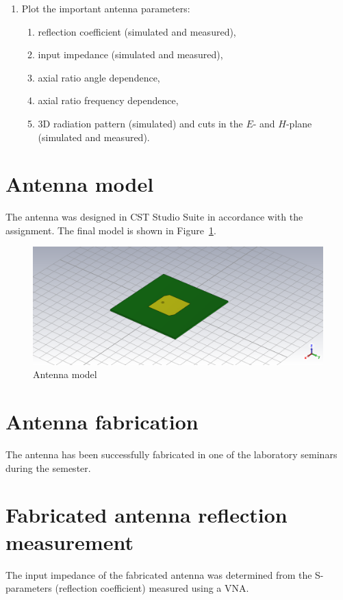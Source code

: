 \documentclass[11pt,a4paper]{article}
\begin{document}
\begin{enumerate}[label=\arabic*.]
        \item Plot the important antenna parameters:
        \begin{enumerate}[label=4.\arabic*]
            \item reflection coefficient (simulated and measured),
            \item input impedance (simulated and measured),
            \item axial ratio angle dependence,
            \item axial ratio frequency dependence,
            \item 3D radiation pattern (simulated) and cuts in the $E$- and $H$-plane (simulated and measured).
        \end{enumerate}
    \end{enumerate}

\newpage
    \section{Antenna model}
        The antenna was designed in CST Studio Suite in accordance with the assignment. The final model is shown in Figure~\ref{fig:model}.
        \begin{figure}[!ht]
            \centering
            \includegraphics[width=.8\textwidth]{src/model.png}
            \caption{\label{fig:model}Antenna model}
        \end{figure}

    \section{Antenna fabrication}
        The antenna has been successfully fabricated in one of the laboratory seminars during the semester.

    \section{Fabricated antenna reflection measurement}
        The input impedance of the fabricated antenna was determined from the S-parameters (reflection coefficient) measured using a VNA.
        
\end{document}
